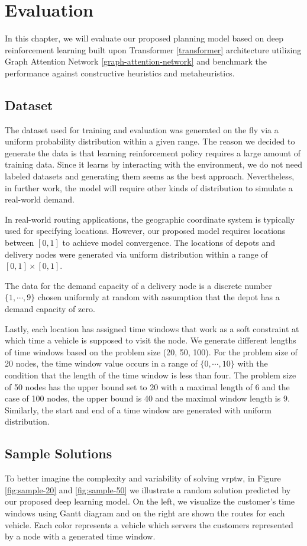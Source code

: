 \chapter{Evaluation}\label{evaluation}

In this chapter, we will evaluate our proposed planning model based on deep reinforcement learning built upon Transformer \ref{transformer} architecture utilizing Graph Attention Network \ref{graph-attention-network} and benchmark the performance against constructive heuristics and metaheuristics.

\section{Dataset}
The dataset used for training and evaluation was generated on the fly via a uniform probability distribution within a given range. The reason we decided to generate the data is that learning reinforcement policy requires a large amount of training data. Since it learns by interacting with the environment, we do not need labeled datasets and generating them seems as the best approach. Nevertheless, in further work, the model will require other kinds of distribution to simulate a real-world demand.

In real-world routing applications, the geographic coordinate system is typically used for specifying locations. However, our proposed model requires locations between $[0, 1]$ to achieve model convergence. The locations of depots and delivery nodes were generated via uniform distribution within a range of $[0, 1] \times [0, 1]$.

The data for the demand capacity of a delivery node is a discrete number $\{1, \cdots, 9\}$ chosen uniformly at random with assumption that the depot has a demand capacity of zero. 

Lastly, each location has assigned time windows that work as a soft constraint at which time a vehicle is supposed to visit the node. We generate different lengths of time windows based on the problem size (20, 50, 100). For the problem size of 20 nodes, the time window value occurs in a range of $\{0, \cdots, 10\}$ with the condition that the length of the time window is less than four. The problem size of 50 nodes has the upper bound set to 20 with a maximal length of 6 and the case of 100 nodes, the upper bound is 40 and the maximal window length is 9. Similarly, the start and end of a time window are generated with uniform distribution.

\section{Sample Solutions}
To better imagine the complexity and variability of solving \gls{vrptw}, in Figure \ref{fig:sample-20} and \ref{fig:sample-50} we illustrate a random solution predicted by our proposed deep learning model. On the left, we visualize the customer's time windows using Gantt diagram and on the right are shown the routes for each vehicle. Each color represents a vehicle which servers the customers represented by a node with a generated time window.

